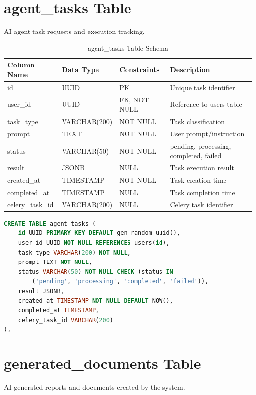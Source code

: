 \documentclass[12pt,a4paper]{report}
\begin{document}
\newpage
\section{agent\_tasks Table}

AI agent task requests and execution tracking.

\begin{table}[h]
\centering
\small
\caption{agent\_tasks Table Schema}
\begin{tabular}{|l|l|l|l|}
\toprule
\textbf{Column Name} & \textbf{Data Type} & \textbf{Constraints} & \textbf{Description} \\
\midrule
id & UUID & PK & Unique task identifier \\
user\_id & UUID & FK, NOT NULL & Reference to users table \\
task\_type & VARCHAR(200) & NOT NULL & Task classification \\
prompt & TEXT & NOT NULL & User prompt/instruction \\
status & VARCHAR(50) & NOT NULL & pending, processing, completed, failed \\
result & JSONB & NULL & Task execution result \\
created\_at & TIMESTAMP & NOT NULL & Task creation time \\
completed\_at & TIMESTAMP & NULL & Task completion time \\
celery\_task\_id & VARCHAR(200) & NULL & Celery task identifier \\
\bottomrule
\end{tabular}
\end{table}

\begin{lstlisting}[language=SQL,basicstyle=\ttfamily\small]
CREATE TABLE agent_tasks (
    id UUID PRIMARY KEY DEFAULT gen_random_uuid(),
    user_id UUID NOT NULL REFERENCES users(id),
    task_type VARCHAR(200) NOT NULL,
    prompt TEXT NOT NULL,
    status VARCHAR(50) NOT NULL CHECK (status IN 
        ('pending', 'processing', 'completed', 'failed')),
    result JSONB,
    created_at TIMESTAMP NOT NULL DEFAULT NOW(),
    completed_at TIMESTAMP,
    celery_task_id VARCHAR(200)
);
\end{lstlisting}

\newpage
\section{generated\_documents Table}

AI-generated reports and documents created by the system.
\end{document}
